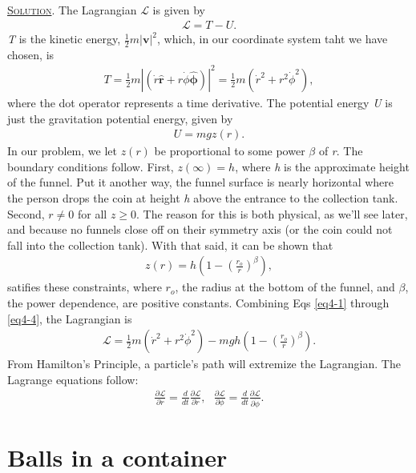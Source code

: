 \documentclass[11pt]{article}
\begin{document}
\subsection[Solution]{} \textsc{\underline{Solution}}. The Lagrangian $\mathcal{L}$ is given by
\begin{align} \label{eq4-1}
\mathcal{L} = T-U.
\end{align}
\textit{T} is the kinetic energy, $\frac{1}{2} m |\textbf{v}|^2$, which, in our coordinate system taht we have chosen, is
\begin{align} \label{eq4-2}
T = \frac{1}{2} m | (\dot{r}\boldsymbol{\hat{r}} + r\dot{\phi}\boldsymbol{\hat{\phi}})|^2 = \frac{1}{2} m (\dot{r}^2 + r^2 \dot{\phi}^2),
\end{align}
where the dot operator represents a time derivative. The potential energy \textit{U} is just the gravitation potential energy, given by
\begin{align} \label{eq4-3}
U = mgz(r).
\end{align}
In our problem, we let $z(r)$ be proportional to some power $\beta$ of \textit{r}. The boundary conditions follow. First, $z(\infty) = h$, where \textit{h} is the approximate height of the funnel. Put it another way, the funnel surface is nearly horizontal where the person drops the coin at height \textit{h} above the entrance to the collection tank. Second, $r \neq 0$ for all $z \geq 0$. The reason for this is both physical, as we'll see later, and because no funnels close off on their symmetry axis (or the coin could not fall into the collection tank). With that said, it can be shown that
\begin{align} \label{eq4-4}
z(r) = h\left(1 - \left(\frac{r_o}{r}\right)^\beta \right),
\end{align}
satifies these constraints, where $r_o$, the radius at the bottom of the funnel, and $\beta$, the power dependence, are positive constants. Combining Eqs \eqref{eq4-1} through \eqref{eq4-4}, the Lagrangian is
\begin{align} \label{eq5-5}
\mathcal{L} = \frac{1}{2} m (\dot{r}^2 + r^2 \dot{\phi}^2) - mgh\left(1 - \left(\frac{r_o}{r}\right)^\beta \right).
\end{align}
From Hamilton's Principle, a particle's path will extremize the Lagrangian. The Lagrange equations follow:
\begin{subequations}
\begin{align}
\label{eq5-6a} \frac{\partial \mathcal{L}}{\partial r} = \frac{d}{dt} \frac{\partial \mathcal{L}}{\partial \dot{r}},\ \ \ 
 \frac{\partial \mathcal{L}}{\partial \phi} = \frac{d}{dt} \frac{\partial \mathcal{L}}{\partial \dot{\phi}}.
\end{align}
\end{subequations}

\section{Balls in a container}

\subsection[Problem Statement]{}
\end{document}
